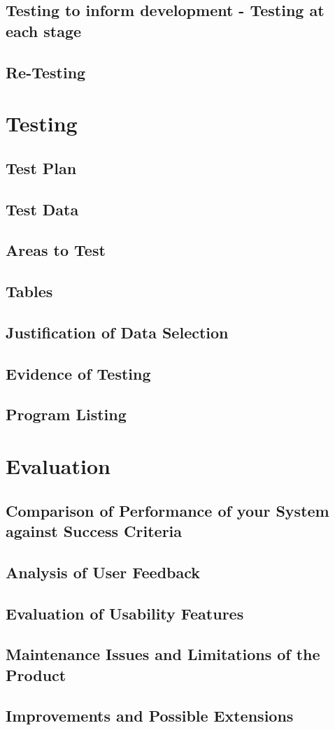 \documentclass[11pt]{article}
\begin{document}
        \subsection{Testing to inform development - Testing at each stage}
        \subsection{Re-Testing}

    \section{Testing}
        \subsection{Test Plan}
        \subsection{Test Data}
        \subsection{Areas to Test}
        \subsection{Tables}
        \subsection{Justification of Data Selection}
        \subsection{Evidence of Testing}
        \subsection{Program Listing}
    
    \section{Evaluation}
        \subsection{Comparison of Performance of your System against Success Criteria}
        \subsection{Analysis of User Feedback}
        \subsection{Evaluation of Usability Features}
        \subsection{Maintenance Issues and Limitations of the Product}
        \subsection{Improvements and Possible Extensions}
        
\end{document}

